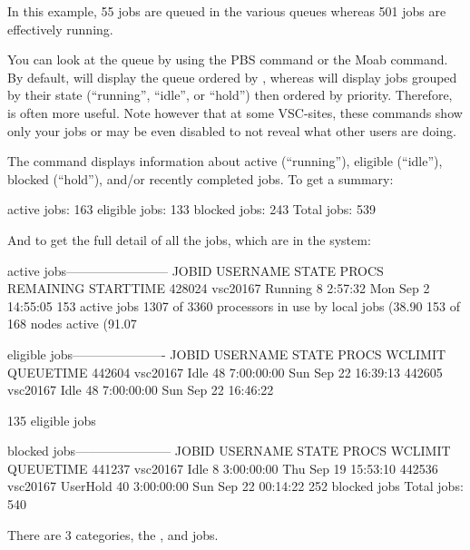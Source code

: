   In this example, 55 jobs are queued in the various queues whereas 501 jobs
  are effectively running.

\else
  You can look at
  the queue by using the PBS  command or the Moab
   command. By default,  will display the queue
  ordered by , whereas  will display jobs grouped by
  their state (``running'', ``idle'', or ``hold'') then ordered by priority.
  Therefore,  is often more useful.
  Note however that at some VSC-sites, these commands show only your jobs or may
  be even disabled to not reveal what other users are doing.

  The  command displays information about active (``running''),
  eligible (``idle''), blocked (``hold''), and/or recently completed jobs. To get
  a summary:

\begin{prompt}
active jobs: 163
eligible jobs: 133
blocked jobs: 243
Total jobs:  539
\end{prompt}

\fi
\fi

\ifantwerpen
And to get the full detail of all the jobs, which are in the system:

\begin{prompt}
active jobs------------------------
JOBID     USERNAME  STATE PROCS REMAINING          STARTTIME
428024    vsc20167  Running   8   2:57:32  Mon Sep  2 14:55:05
153 active jobs 1307 of 3360 processors in use by local jobs (38.90%
153 of 168 nodes active      (91.07%

eligible jobs----------------------
JOBID     USERNAME  STATE PROCS   WCLIMIT            QUEUETIME
442604    vsc20167   Idle  48  7:00:00:00  Sun Sep 22 16:39:13
442605    vsc20167   Idle  48  7:00:00:00  Sun Sep 22 16:46:22

135 eligible jobs

blocked jobs-----------------------
JOBID   USERNAME     STATE PROCS WCLIMIT            QUEUETIME
441237  vsc20167      Idle   8 3:00:00:00 Thu Sep 19 15:53:10
442536  vsc20167  UserHold  40 3:00:00:00 Sun Sep 22 00:14:22
252 blocked jobs
Total jobs:  540
\end{prompt}
\fi

\ifgent
\else
\ifbrussel
\else
  There are 3 categories, the ,  and  jobs.

